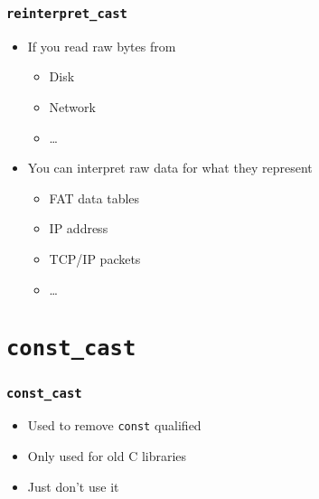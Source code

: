 \begin{frame}
  \frametitle{{\tt reinterpret\_cast}}
   \begin{itemize}
    \item If you read raw bytes from
          \begin{itemize}
            \item Disk
            \item Network
            \item \dots
          \end{itemize}
    \item You can interpret raw data for what they represent
          \begin{itemize}
            \item FAT data tables
            \item IP address
            \item TCP/IP packets
            \item \dots
          \end{itemize}
  \end{itemize}
\end{frame}

\section{{\tt const\_cast}}

\frame{\tableofcontents[currentsection]}

\begin{frame}
  \frametitle{{\tt const\_cast}}
  \begin{itemize}
    \item Used to remove {\tt const} qualified
    \item Only used for old C libraries
    \item Just don't use it
  \end{itemize}
\end{frame}




